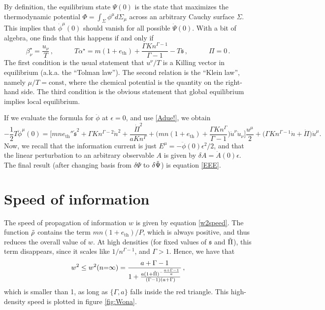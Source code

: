 \documentclass[a4paper, amsfonts, amssymb, amsmath, reprint, showkeys, nofootinbib, twoside,notitlepage,onecolumn]{revtex4-2}
\newcommand{\spc}{\quad \quad \quad}
\newcommand{\s}{{\mathfrak{s}}}
\theoremstyle{definition}
\theoremstyle{theorem}
\theoremstyle{corollary}
\begin{document}
By definition, the equilibrium state $\Psi(0)$ is the state that maximizes the thermodynamic potential $\Phi=\int_\Sigma \phi^\mu d\Sigma_\mu$ across an arbitrary Cauchy surface $\Sigma$. This implies that $\dot{\phi}^\mu(0)$ should vanish for all possible $\dot{\Psi}(0)$. With a bit of algebra, one finds that this happens if and only if
\begin{equation}\label{Adue!}
\beta^\star_\nu =\dfrac{u_\nu}{T} \, , \spc T\alpha^\star=m(1{+}e_\text{th})+\dfrac{\Gamma K n^{\Gamma-1}}{\Gamma{-}1}-T\s \, , \spc \Pi=0 \, .
\end{equation}
The first condition is the usual statement that $u^\nu/T$ is a Killing vector in equilibrium \cite{BecattiniBeta2016} (a.k.a. the ``Tolman law''). The second relation is the ``Klein law'', namely $\mu/T=\text{const}$, where the chemical potential is the quantity on the right-hand side. The third condition is the obvious statement that global equilibrium implies local equilibrium.

If we evaluate the formula for $\ddot{\phi}$ at $\epsilon=0$, and use \eqref{Adue!}, we obtain
\begin{equation}
-\dfrac{1}{2} T\ddot{\phi}^\mu(0) = \bigg[ mne_\text{th}''\dot{\s}^2+\Gamma Kn^{\Gamma-2} \dot{n}^2 +\dfrac{\dot{\Pi}^2}{aKn^\Gamma}+ \bigg( mn(1{+}e_\text{th})+\dfrac{\Gamma Kn^\Gamma}{\Gamma{-}1}    \bigg) \dot{u}^\nu \dot{u}_\nu \bigg]\dfrac{u^\mu}{2}  +\big( \Gamma K n^{\Gamma-1} \dot{n}     +\dot{\Pi} \big) \dot{u}^\mu .
\end{equation}
Now, we recall that the information current is just $E^\mu =-\ddot{\phi}(0) \epsilon^2/2$, and that the linear perturbation to an arbitrary observable $A$ is given by $\delta A=\dot{A}(0)\epsilon$. The final result (after changing basis from $\delta \Psi$ to $ \delta \Tilde{\Psi}$) is equation \eqref{EEE}.

\section{Speed of information}\label{laspeedishere}


The speed of propagation of information $w$ is given by equation \eqref{w2speed}. The function $\Tilde{\rho}$ contains the term $mn(1+e_\text{th})/P$, which is always positive, and thus reduces the overall value of $w$. At high densities (for fixed values of $\s$ and $\Tilde{\Pi}$), this term disappears, since it scales like $1/n^{\Gamma-1}$, and $\Gamma>1$. Hence, we have that 
\begin{equation}
w^2 \leq w^2(n{=}\infty)= \frac{a+\Gamma-1}{1+\frac{a (1+\Tilde{\Pi})^{-\frac{a+\Gamma-1}{a}}}{(\Gamma-1) (a+\Gamma)}} \, ,
\end{equation}
which is smaller than 1, as long as $\{\Gamma,a\}$ falls inside the red triangle. This high-density speed is plotted in figure \ref{fig:Wona}.
\end{document}
